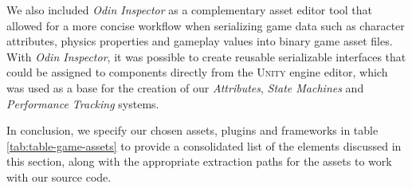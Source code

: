 We also included \emph{Odin Inspector} as a complementary asset editor tool that allowed for a more concise workflow when serializing game data such as character attributes, physics properties and gameplay values into binary game asset files. With \emph{Odin Inspector}, it was possible to create reusable serializable interfaces that could be assigned to components directly from the \textsc{Unity} engine editor, which was used as a base for the creation of our \emph{Attributes}, \emph{State Machines} and \emph{Performance Tracking} systems.

In conclusion, we specify our chosen assets, plugins and frameworks in table \ref{tab:table-game-assets} to provide a consolidated list of the elements discussed in this section, along with the appropriate extraction paths for the assets to work with our source code.





